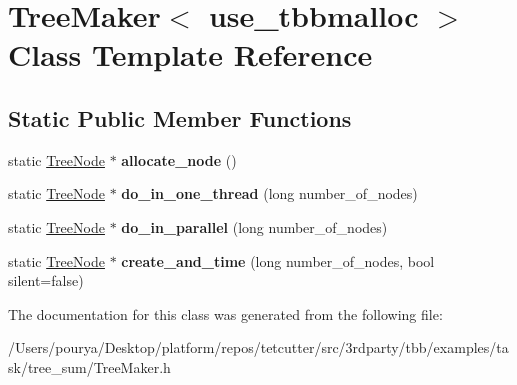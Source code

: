 \hypertarget{classTreeMaker}{}\section{Tree\+Maker$<$ use\+\_\+tbbmalloc $>$ Class Template Reference}
\label{classTreeMaker}
\subsection*{Static Public Member Functions}
\begin{DoxyCompactItemize}
\item 
\hypertarget{classTreeMaker_a5217238eee6eac3a832bf96141e66eb7}{}static \hyperlink{structTreeNode}{Tree\+Node} $\ast$ {\bfseries allocate\+\_\+node} ()\label{classTreeMaker_a5217238eee6eac3a832bf96141e66eb7}

\item 
\hypertarget{classTreeMaker_a574539399c34b658803e20ba673f97d7}{}static \hyperlink{structTreeNode}{Tree\+Node} $\ast$ {\bfseries do\+\_\+in\+\_\+one\+\_\+thread} (long number\+\_\+of\+\_\+nodes)\label{classTreeMaker_a574539399c34b658803e20ba673f97d7}

\item 
\hypertarget{classTreeMaker_a43e519e3533bdd711fbaaa43329c94d5}{}static \hyperlink{structTreeNode}{Tree\+Node} $\ast$ {\bfseries do\+\_\+in\+\_\+parallel} (long number\+\_\+of\+\_\+nodes)\label{classTreeMaker_a43e519e3533bdd711fbaaa43329c94d5}

\item 
\hypertarget{classTreeMaker_a062a060d3f0fee110837d4f933da35c6}{}static \hyperlink{structTreeNode}{Tree\+Node} $\ast$ {\bfseries create\+\_\+and\+\_\+time} (long number\+\_\+of\+\_\+nodes, bool silent=false)\label{classTreeMaker_a062a060d3f0fee110837d4f933da35c6}

\end{DoxyCompactItemize}


The documentation for this class was generated from the following file\+:\begin{DoxyCompactItemize}
\item 
/\+Users/pourya/\+Desktop/platform/repos/tetcutter/src/3rdparty/tbb/examples/task/tree\+\_\+sum/Tree\+Maker.\+h\end{DoxyCompactItemize}

